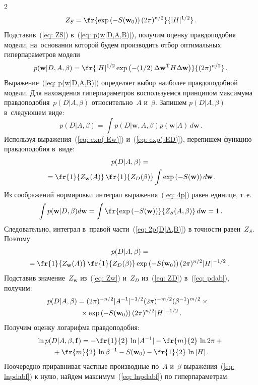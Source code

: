 \begin{multicols}{2}
\begin{equation}
Z_S=\fr{\exp\left(-S(\mathbf{w}_0)\right)(2\pi)^{{n}/{2}}}{|H|^{{1}/{2}}}\,.
\end{equation}
Подставив~(\ref{eq: ZS}) в~(\ref{eq: p(w|D,A,B)}), получим оценку
правдоподобия модели, на~основании которой будем производить отбор
оптимальных гиперпараметров модели
\begin{equation*}
p(\mathbf{w}|D,A,\beta)=\fr{|H|^{{1}/{2}}\exp\left(-({1}/{2})\,\Delta\mathbf{w}^{\mathrm{T}} H 
\Delta \mathbf{w}\right)}{(2\pi)^{{n}/{2}}}\,.
\end{equation*}
Выражение~(\ref{eq: p(w|D,A,B)}) определяет выбор наиболее
правдоподобной модели. Для нахождения ги\-пер\-па\-ра\-мет\-ров воспользуемся
принципом максимума правдоподобия~$p(D|A,\beta)$ относительно~$A$ 
и~$\beta$. Запишем $p(D|A,\beta)$ в~следующем виде:
\begin{equation*}
p(D|A,\beta)=\int p(D|\mathbf{w},A,\beta)p(\mathbf{w}|A)\,d\mathbf{w}\,.
\end{equation*}
Используя выражения~(\ref{eq: exp(-Ew)}) и~(\ref{eq: exp(-ED)}), 
перепишем функцию правдоподобия в~виде:
\begin{multline}
\label {eq: 2p(D|A,B)}
p(D|A,\beta)={}\\
{}=\fr{1}{Z_{\mathbf{w}}(A)}\,\fr{1}{Z_{D}(\beta)}
\int \exp\left(-S(\mathbf{w})\right)d\mathbf{w}\,.
\end{multline}
Из соображений нормировки интеграл выражения~(\ref{eq: 4p}) равен единице, т.\,е.\
$$
\int p(\mathbf{w}|D,\beta)d\mathbf{w}=\int 
\fr{\exp\left(-S(\mathbf{w})\right)}{Z_{S}(A,\beta)}\,d\mathbf{w}=1\,.
$$
Следовательно, интеграл в~правой части~(\ref{eq: 2p(D|A,B)}) в точ\-ности равен~$Z_S$. Поэтому
\begin{multline}
\label {eq: pdab}
p(D|A,\beta)={}\\
\hspace*{-3mm}{}=\fr{1}{Z_{\mathbf{w}}(A)}\,\fr{1}{Z_{D}(\beta)}
\exp\left(-S(\mathbf{w}_0)\right)(2\pi)^{{n}/{2}}|H|^{-{1}/{2}}\,.\!
\end{multline}
Подставив значение~$Z_\mathbf{w}$ из~(\ref{eq: Zw}) и~$Z_D$ из~(\ref{eq: ZD}) 
в~(\ref{eq: pdab}), получим:
\begin{multline*}
\hspace*{-2.5mm}p(D|A,\beta)=(2\pi)^{-{n}/{2}}|A^{-1}|^{-{1}/{2}}(2\pi)^{-{m}/{2}}(\beta^{-1})^{{m}/{2}} \times{}\\
{}\times
\exp\left(-S(\mathbf{w}_0)\right)(2\pi)^{{n}/{2}}|H|^{-{1}/{2}}\,.
\end{multline*}
Получим оценку логарифма правдоподобия:
\begin{multline}
\label {eq: lnpdabf}
\ln p(D|A,\beta,\mathbf{f})=-\fr{1}{2}\,\ln|A^{-1}|-\fr{m}{2}\,\ln 2\pi + {}\\
{}+
\fr{m}{2}\,\ln\beta^{-1}-S(\mathbf{w}_0)-\fr{1}{2}\,\ln|H|\,.
\end{multline}
Поочередно приравнивая частные производные по~$A$ и~$\beta$ выражения~(\ref{eq: lnpdabf}) 
к нулю, найдем максимум~(\ref{eq: lnpdabf}) по гиперпараметрам.


\end{multicols}
